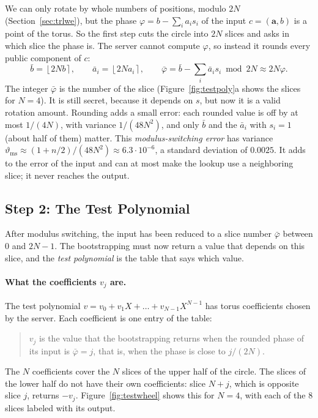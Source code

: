 \documentclass[12pt]{article}
\theoremstyle{plain}
\theoremstyle{definition}
\newcommand{\round}[1]{\left\lfloor #1 \right\rceil}
\begin{document}
We can only rotate by whole numbers of positions, modulo $2N$
(Section~\ref{sec:trlwe}), but the phase $\varphi=b-\sum_ia_is_i$ of the input
$c=(\mathbf a,b)$ is a point of the torus. So the first step cuts the circle
into $2N$ slices and asks in which slice the phase is. The server cannot
compute $\varphi$, so instead it rounds every public component of $c$:
\[
  \bar b=\round{2Nb},\qquad \bar a_i=\round{2Na_i},\qquad
  \bar\varphi=\bar b-\sum_i\bar a_is_i\bmod 2N\approx2N\varphi.
\]
The integer $\bar\varphi$ is the number of the slice
(Figure~\ref{fig:testpoly}a shows the slices for $N=4$). It is still secret,
because it depends on $s$, but now it is a valid rotation amount. Rounding adds
a small error: each rounded value is off by at most $1/(4N)$, with variance
$1/(48N^2)$, and only $\bar b$ and the $\bar a_i$ with $s_i=1$ (about half of
them) matter. This \emph{modulus-switching error} has variance
$\vartheta_{\mathrm{ms}}\approx(1+n/2)/(48N^2)\approx6.3\cdot10^{-6}$, a standard
deviation of $0.0025$. It adds to the error of the input and can at most make
the lookup use a neighboring slice; it never reaches the output.

\subsection{Step 2: The Test Polynomial}
\label{sec:testpoly}

After modulus switching, the input has been reduced to a slice number
$\bar\varphi$ between $0$ and $2N-1$. The bootstrapping must now return a value
that depends on this slice, and the \emph{test polynomial} is the table that
says which value.

\paragraph{What the coefficients $v_j$ are.}
The test polynomial $v=v_0+v_1X+\dots+v_{N-1}X^{N-1}$ has torus coefficients
chosen by the server. Each coefficient is one entry of the table:
\begin{quote}
  $v_j$ is the value that the bootstrapping returns when the rounded phase of
  its input is $\bar\varphi=j$, that is, when the phase is close to $j/(2N)$.
\end{quote}
The $N$ coefficients cover the $N$ slices of the upper half of the circle. The
slices of the lower half do not have their own coefficients: slice $N+j$, which
is opposite slice $j$, returns $-v_j$. Figure~\ref{fig:testwheel} shows this for
$N=4$, with each of the $8$ slices labeled with its output.
\end{document}
